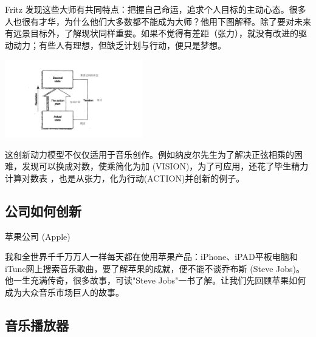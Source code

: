 Fritz
发现这些大师有共同特点：把握自己命运，追求个人目标的主动心态。很多人也很有才华，为什么他们大多数都不能成为大师？他用下图解释。除了要对未来有远景目标外，了解现状同样重要。如果不觉得有差距（张力），就没有改进的驱动动力；有些人有理想，但缺乏计划与行动，便只是梦想。


\includegraphics[width=6cm]{liuct.png}


这创新动力模型不仅仅适用于音乐创作。例如纳皮尔先生为了解决正弦相乘的困难，发现可以换成对数，使乘简化为加 (VISION)，为了可应用，还花了毕生精力计算对数表 ，也是从张力，化为行动(ACTION)并创新的例子。



\hypertarget{ux516cux53f8ux5982ux4f55ux521bux65b0}{%
\subsection{公司如何创新}\label{ux516cux53f8ux5982ux4f55ux521bux65b0}}


苹果公司 (Apple)

我和全世界千千万万人一样每天都在使用苹果产品：iPhone、iPAD平板电脑和iTune网上搜索音乐歌曲，要了解苹果的成就，便不能不谈乔布斯
(Steve Jobs)。他一生充满传奇，很多故事，可读"Steve
Jobs"一书了解。让我们先回顾苹果如何成为大众音乐市场巨人的故事。

\begin{description}
\item[]
\begin{description}
\tightlist
\item[]
= = =
\end{description}
\end{description}

\hypertarget{ux97f3ux4e50ux64adux653eux5668}{%
\subsection{音乐播放器}\label{ux97f3ux4e50ux64adux653eux5668}}

